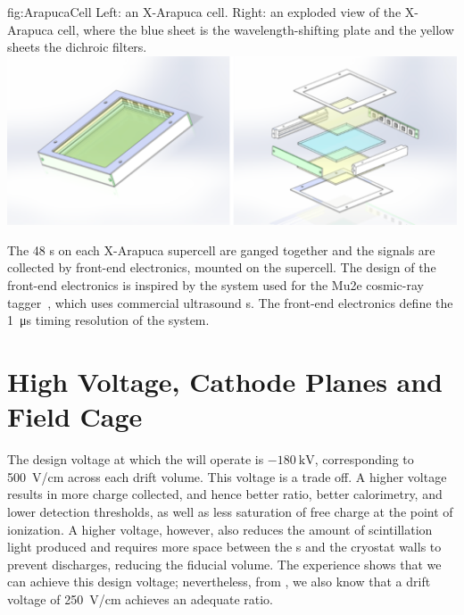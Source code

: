 \begin{dunefigure}{fig:ArapucaCell}
{Left: an X-Arapuca cell. Right: an exploded view of the X-Arapuca cell, where the blue sheet is the wavelength-shifting plate and the yellow sheets the dichroic filters.}
\includegraphics[width=\textwidth]{graphics/XArapuca.pdf}
\end{dunefigure}

The 48 s on each X-Arapuca supercell are ganged together and the signals are collected by front-end electronics, mounted on the supercell. The design of the front-end electronics is inspired by the system used for the Mu2e cosmic-ray tagger~\cite{bib:mu2e_tdr}, which uses commercial ultrasound s. The front-end electronics define the \SI{1}{\micro\second} timing resolution of the  system.

\section{High Voltage, Cathode Planes and Field Cage}
\label{sec:fdsp-exec-hv}

The design voltage at which the   will operate is $-\SI{180}{\kilo\volt}$, corresponding to \SI{500}{\volt/\cm} across each drift volume. This voltage is a trade off. A higher voltage results in more charge collected, and hence better  ratio, better calorimetry, and lower detection thresholds, as well as less saturation of free charge at the point of ionization. A higher voltage, however, also reduces the amount of scintillation light produced and requires more space between the s and the cryostat walls to prevent discharges, reducing the fiducial volume. The  experience shows that we can achieve this design voltage; nevertheless, from , we also know that a drift voltage of \SI{250}{\volt/\cm} achieves an adequate  ratio.

